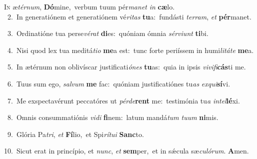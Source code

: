 \lettrine{\initial\textcolor{\initialcolor}{I}}{n} æ\-\textit{tér}\-\textit{num}, \textbf{Dó}\-mine,~\star verbum tuum pér\-\textit{ma}\-\textit{net} \textit{in} \textbf{cæ}\-lo.\\
{\numbfont\textcolor{\numbcolor}{~2.}}~In generatiónem et generatiónem vé\-\textit{ri}\-\textit{tas} \textbf{tu}\-a:~\star fundásti \textit{ter}\-\textit{ram}, \textit{et} \textbf{pér}\-manet.\par
{\numbfont\textcolor{\numbcolor}{~3.}}~Ordinatióne tua perse\-\textit{vé}\-\textit{rat} \textbf{di}\-es:~\star quóniam ómnia \textit{sér}\-\textit{vi}\textit{unt} \textbf{ti}\-bi.\par
{\numbfont\textcolor{\numbcolor}{~4.}}~Nisi quod lex tua meditá\-\textit{ti}\-\textit{o} \textbf{me}\-a est:~\star tunc forte periíssem in humi\-\textit{li}\-\textit{tá}\textit{te} \textbf{me}\-a.\par
{\numbfont\textcolor{\numbcolor}{~5.}}~In ætérnum non oblivíscar justificati\-\textit{ó}\-\textit{nes} \textbf{tu}\-as:~\star quia in ipsis \textit{vi}\-\textit{vi}\textit{fi}\textbf{cás}ti me.\par
{\numbfont\textcolor{\numbcolor}{~6.}}~Tuus sum ego, \textit{sal}\-\textit{vum} \textbf{me} fac:~\star quóniam justificatiónes tu\textit{as} \textit{ex}\-\textit{qui}\textbf{sí}vi.\par
{\numbfont\textcolor{\numbcolor}{~7.}}~Me exspectavérunt peccatóres ut \textit{pér}\-\textit{de}\textbf{rent} me:~\star testimónia tu\textit{a} \textit{in}\-\textit{tel}\textbf{lé}xi.\par
{\numbfont\textcolor{\numbcolor}{~8.}}~Omnis consummatiónis \textit{vi}\-\textit{di} \textbf{fi}\-nem:~\star latum mandá\textit{tum} \textit{tu}\-\textit{um} \textbf{ni}\-mis.\par
{\numbfont\textcolor{\numbcolor}{~9.}}~Glória Pa\-\textit{tri}\-, \textit{et} \textbf{Fí}\-lio,~\star et Spi\-\textit{rí}\-\textit{tu}\textit{i} \textbf{Sanc}\-to.\par
{\numbfont\textcolor{\numbcolor}{10.}}~Sicut erat in princípio, et \textit{nunc}\-, \textit{et} \textbf{sem}\-per,~\star et in sǽcula sæ\-\textit{cu}\-\textit{ló}\textit{rum}. \textbf{A}\-men.\par
